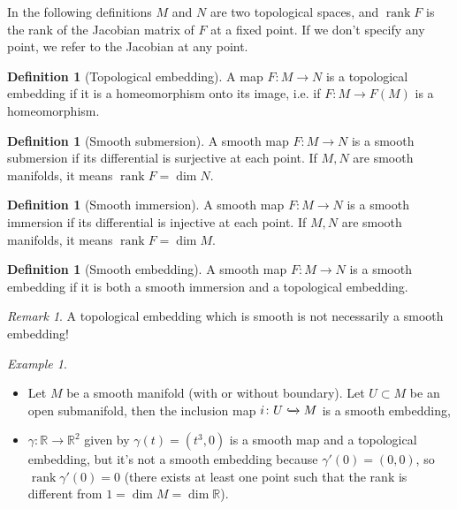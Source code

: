 \documentclass[a4paper,11pt,titlepage, article, oneside]{memoir}
\numberwithin{equation}{section}
\theoremstyle{definition}
\newtheorem{definition}[theorem]{Definition}
\theoremstyle{remark}
\newtheorem{remark}[theorem]{Remark}
\newtheorem{example}[theorem]{Example}
\DeclareMathOperator{\rank}{rank}
\newcommand{\rfield}{\mathbb{R}}
\begin{document}
In the following definitions $M$ and $N$ are two topological spaces, and $\rank F$ is the rank of the Jacobian matrix of $F$ at a fixed point. If we don't specify any point, we refer to the Jacobian at any point.

\begin{definition}[Topological embedding]
A map $F\colon M \rightarrow N$ is a topological embedding if it is a homeomorphism onto its image, i.e. if $F\colon M \rightarrow F(M)$ is a homeomorphism.
\end{definition}

\begin{definition}[Smooth submersion] \label{smoothsubm}
A smooth map $F\colon M \rightarrow N$ is a smooth submersion if its differential is surjective at each point. If $M, N$ are smooth manifolds, it means $\rank F = \dim N$.
\end{definition}

\begin{definition}[Smooth immersion]
A smooth map $F \colon M \rightarrow N$ is a smooth immersion if its differential is injective at each point. If $M, N$ are smooth manifolds, it means $\rank F = \dim M$.
\end{definition}

\begin{definition}[Smooth embedding] \label{smoothembedd}
A smooth map $F \colon M \rightarrow N$ is a smooth embedding if it is both a smooth immersion and a topological embedding.
\end{definition}

\begin{remarkbox}\begin{remark}
A topological embedding which is smooth is not necessarily a smooth embedding!
\end{remark}\end{remarkbox}

\begin{tcolorbox}\begin{example}
$ $
\begin{itemize}
\item Let $M$ be a smooth manifold (with or without boundary). Let $U \subset M$ be an open submanifold, then the inclusion map $i \colon U \xhookrightarrow{} M$ is a smooth embedding,
\item $\gamma \colon \rfield \rightarrow \rfield^2$ given by $\gamma(t) = (t^3, 0)$ is a smooth map and a topological embedding, but it's not a smooth embedding because $\gamma ' (0) = (0, 0)$, so $\rank \gamma'(0) = 0$ (there exists at least one point such that the rank is different from $1 = \dim M = \dim \rfield$).
\end{itemize}
\end{example}\end{tcolorbox}
\end{document}
